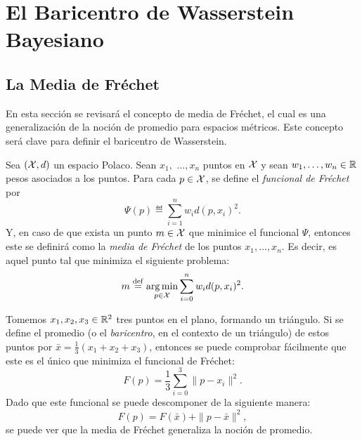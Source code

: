 {{  }  %

  \section{El Baricentro de Wasserstein Bayesiano}\label{sec:el-baricentro-de-Wasserstein-Bayesiano}
  {
	  \subsection*{La Media de Fréchet}\label{ssec:la-media-de-Frechet}
	  {
		  En esta sección se revisará el concepto de media de Fréchet, el cual es una generalización de la noción de promedio para espacios métricos. Este concepto será clave para definir el baricentro de Wasserstein.
		  \begin{definition}
			  Sea $(\mathcal{X}, d)$ un espacio Polaco. Sean $x_1,$ $\ldots, x_n$ puntos en $\mathcal{X}$ y sean $w_1,\ldots,w_n\in\mathbb{R}$ pesos asociados a los puntos. Para cada $p\in\mathcal{X}$, se define el \emph{funcional de Fréchet} por
			  \begin{equation}
				  \label{eq:funcionalFrechet}
				  \Psi(p) \eqdef \sum_{i=1}^{n} w_i d(p, x_i)^2.
			  \end{equation}
			  Y, en caso de que exista un punto $m \in \mathcal{X}$ que minimice el funcional $\Psi$, entonces este se definirá como la \emph{media de Fréchet} de los puntos $x_1,\ldots, x_n$. Es decir, es aquel punto tal que minimiza el siguiente problema:
			  \begin{equation}
				  \label{eq:mediaFrechet}
				  m \stackrel{\mathrm{def}}{=} \operatorname*{arg\,m{i}n}_{p \in \mathcal{X}} \sum_{i=0}^{n} w_i d(p, x_i)^2.
			  \end{equation}
		  \end{definition}

		  \begin{example}\label{ex:baricentro-triangulo}
			  Tomemos $x_1, x_2, x_3 \in \mathbb{R}^2$ tres puntos en el plano, formando un triángulo. Si se define el promedio (o el \textit{baricentro}, en el contexto de un triángulo) de estos puntos por $\bar x = \frac{1}{3} (x_1 + x_2 + x_3)$, entonces se puede comprobar fácilmente que este es el único que minimiza el funcional de Fréchet:
			  \begin{equation}
				  F(p) = \frac{1}{3} \sum_{i=0}^{3} \|p - x_i\|^2.
			  \end{equation}
			  Dado que este funcional se puede descomponer de la siguiente manera:
			  \begin{equation}
				  F(p) = F(\bar x) + \|p-\bar x\|^2,
			  \end{equation}
			  se puede ver que la media de Fréchet generaliza la noción de promedio.
		  \end{example}

}}}
